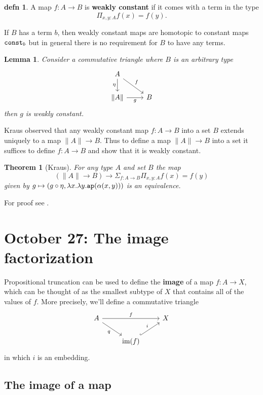 \documentclass{amsart}
\theoremstyle{theorem}
\newtheorem*{thm}{Theorem}
\newtheorem*{lem}{Lemma}
\theoremstyle{definition}
\newtheorem*{defn}{defn}
\theoremstyle{remark}
\newcommand{\0}{\mathbbe{0}}
\newcommand{\1}{\mathbbe{1}}
\newcommand{\2}{\mathbbe{2}}
\newcommand{\3}{\mathbbe{3}}
\newcommand{\4}{\mathbbe{4}}
\newcommand{\term}[1]{{\textup{\texttt{#1}}}}
\newcommand{\type}[1]{{\textup{#1}}}
\newcommand{\ap}{\term{ap}}
\newcommand{\mere}[1]{\|{#1}\|}
\newcommand{\im}[1]{\type{im}(#1)}
\begin{document}
\begin{defn} A map $f \colon A \to B$ is \textbf{weakly constant} if it comes with a term in the type
\[ \Pi_{x,y:A} f(x) = f(y).\]
\end{defn}

If $B$ has a term $b$, then weakly constant maps are homotopic to constant maps $\term{const}_b$ but in general there is no requirement for $B$ to have any terms.

\begin{lem} Consider a commutative triangle where $B$ is an arbitrary type
\[
\begin{tikzcd} A \arrow[dr, "f"] \arrow[d, "\eta"'] \\ \mere{A} \arrow[r, "g"'] & B
\end{tikzcd}
\]
then $g$ is weakly constant.
\end{lem}

Kraus observed that any weakly constant map $f : A \to B$ into a set $B$ extends uniquely to a map $\mere{A} \to B$. Thus to define a map $\mere{A} \to B$ into a set it suffices to define $f : A \to B$ and show that it is weakly constant. 

\begin{thm}[Kraus]  For any type $A$ and set $B$ the map
\[  (\mere{A} \to B) \to \Sigma_{f:A \to B} \Pi_{x,y:A} f(x) = f(y)\]
given by $g \mapsto (g \circ \eta, \lambda x .\lambda y. \ap(\alpha(x,y)))$ is an equivalence.
\end{thm}

For proof see \cite[\S 14.4]{Rijke}.

\section*{October 27: The image factorization}

Propositional truncation can be used to define the \textbf{image} of a map $f \colon A \to X$, which can be thought of as the smallest subtype of $X$ that contains all of the values of $f$. More precisely, we'll define a commutative triangle
\[
\begin{tikzcd} A \arrow[rr, "f"] \arrow[dr, "q"'] & & X \\ & \im{f} \arrow[ur, "i", hook]
\end{tikzcd}
\]
in which $i$ is an embedding.

\subsection*{The image of a map}
\end{document}
